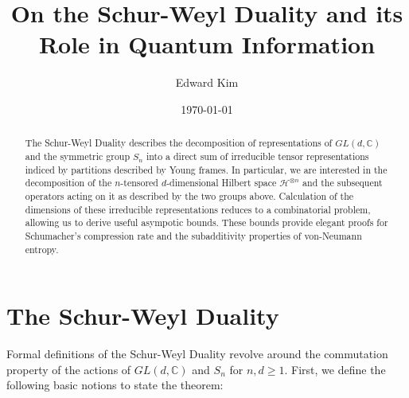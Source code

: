 \documentclass[12pt]{article}%
\begin{document}
\title{On the Schur-Weyl Duality and its Role in Quantum Information}
\author{Edward Kim}
\date{\today}
\maketitle
\begin{abstract}
  The Schur-Weyl Duality describes the decomposition of representations of $GL(d,\mathbb{C})$ and the symmetric group $S_n$ into a direct sum of irreducible tensor representations indiced by partitions described by Young frames. In particular, we are interested in the decomposition of the $n$-tensored $d$-dimensional Hilbert space $\mathcal{H}^{\otimes n}$ and the subsequent operators acting on it as described by the two groups above. Calculation of the dimensions of these irreducible representations reduces to a combinatorial problem, allowing us to derive useful asympotic bounds. These bounds provide elegant proofs for Schumacher's compression rate and the subadditivity properties of von-Neumann entropy.
\end{abstract}

\tableofcontents
\newpage

\section{The Schur-Weyl Duality}
Formal definitions of the Schur-Weyl Duality revolve around the commutation property of the actions of $GL(d,\mathbb{C})$ and $S_n$ for $n,d \geq 1$. First, we define the following basic notions to state the theorem:
\end{document}
